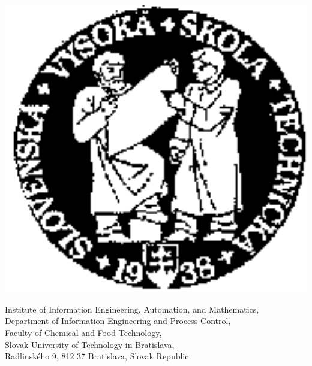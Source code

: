 \begin{minipage}[t]{1\linewidth}
  \vspace{0.1cm}
  \begin{minipage}[t]{0.78\linewidth}
    \vspace{0.1cm}
    \begin{minipage}[t]{0.165\linewidth}
      \vspace{0.1cm}
      \begin{flushleft}
        \includegraphics[width=1\textwidth]{pictures/logostu}
      \end{flushleft}
    \end{minipage}
    \begin{minipage}[t]{0.82\linewidth}
      \vspace{0.1cm}
      \begin{flushleft}
        {\footnotesize{
          \textcolor{black!80!white}{
            Institute of Information Engineering, Automation, and
            Mathematics,\\ 
            Department of Information Engineering and Process
            Control,\\ 
            Faculty of Chemical and Food Technology,\\
            Slovak University of Technology in Bratislava,\\
            Rad\-lin\-sk\'e\-ho 9, 812 37 Bratislava, Slovak Republic.
}}}
\end{flushleft}
\end{minipage}
\end{minipage}
\end{minipage}
